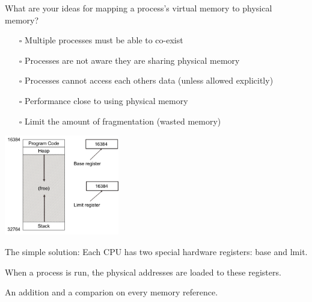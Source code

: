 \begin{slide}
    

    What are your ideas for mapping a process's virtual memory to physical
    memory?

\end{slide}

\begin{slide}


    \begin{itemize}
      \item [$\square$] Multiple processes must be able to co-exist
      \item [$\square$] Processes are not aware they are sharing physical memory
      \item [$\square$] Processes cannot access each others data (unless allowed explicitly)
      \item [$\square$] Performance close to using physical memory
      \item [$\square$] Limit the amount of fragmentation (wasted memory)
    \end{itemize}

\end{slide}
  
\begin{slide}


    \begin{minipage}{0.4\textwidth}
        \includegraphics[width=50mm]{base-limit-reg.png}
    \end{minipage}
    \hfill
    \begin{minipage}{0.58\textwidth}
        The simple solution: Each CPU has two special hardware registers: base and lmit.
        \bigskip

        When a process is run, the physical addresses are loaded to these registers.
        \bigskip

        An addition and a comparion on every memory reference.
        \bigskip
    \end{minipage}

\end{slide}

